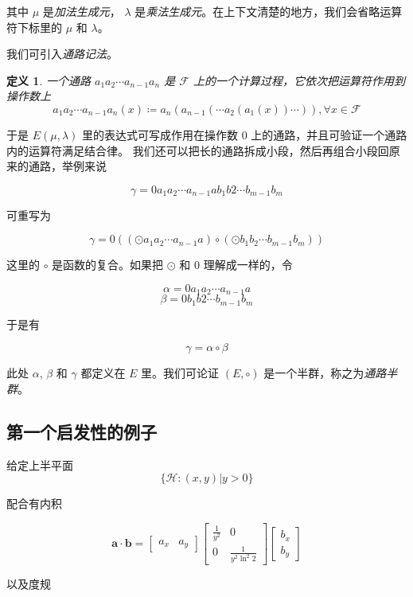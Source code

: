 \documentclass[a4paper,12pt]{article}
\numberwithin{problem}{section}
\newtheorem{definition}{定义}
\numberwithin{definition}{section}
\numberwithin{lemma}{section}
\numberwithin{proposition}{section}
\numberwithin{theorem}{section}
\numberwithin{grammar}{section}
\numberwithin{program}{section}
\numberwithin{convention}{section}
\numberwithin{corollary}{section}
\begin{document}
其中 $\mu$ 是\emph{加法生成元}， $\lambda$ 是\emph{乘法生成元}。在上下文清楚的地方，我们会省略运算符下标里的 $\mu$ 和 $\lambda$。

我们可引入\emph{通路记法}。

\begin{definition}
\label{definition:path}
    一个通路 $a_1 a_2 \cdots a_{n-1} a_n$ 是 $\mathcal{F}$ 上的一个计算过程，它依次把运算符作用到操作数上
    $$a_1 a_2 \cdots a_{n-1} a_n (x) \coloneqq a_n( a_{n-1}( \cdots a_2( a_1(x) ) \cdots ) ), \forall x \in \mathcal{F}$$
\end{definition}

于是 $E(\mu, \lambda)$ 里的表达式可写成作用在操作数 $0$ 上的通路，并且可验证一个通路内的运算符满足结合律。
我们还可以把长的通路拆成小段，然后再组合小段回原来的通路，举例来说

$$\gamma = 0 a_1 a_2 \cdots a_{n-1} a b_1 b2 \cdots b_{m-1} b_m$$

可重写为

$$\gamma = 0 ((\odot a_1 a_2 \cdots a_{n-1} a) \circ (\odot b_1 b_2 \cdots b_{m-1} b_m))$$

这里的 $\circ$ 是函数的复合。如果把 $\odot$ 和 $0$ 理解成一样的，令

$$\alpha = 0 a_1 a_2 \cdots a_{n-1} a$$
$$\beta = 0 b_1 b2 \cdots b_{m-1} b_m$$

于是有

$$\gamma = \alpha \circ \beta$$

此处 $\alpha$, $\beta$ 和 $\gamma$ 都定义在 $E$ 里。我们可论证 $(E, \circ)$ 是一个半群，称之为\emph{通路半群}。

\subsection{第一个启发性的例子}

给定上半平面
\[
\{\mathcal{H}: (x, y) | y > 0 \}
\]

配合有内积

\[
\mathbf{a} \cdot \mathbf{b} = \begin{bmatrix} a_x & a_y \end{bmatrix} \begin{bmatrix} \frac{1}{y^2} & 0 \\ 0 & \frac{1}{y^2\ln^2{2}} \end{bmatrix} \begin{bmatrix} b_x \\ b_y \end{bmatrix}
\]

以及度规
\end{document}

